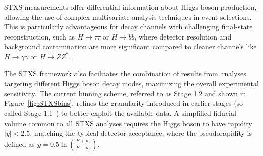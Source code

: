 STXS measurements offer differential information about Higgs boson production, allowing the use of complex multivariate analysis techniques in event selections. This is particularly advantageous for decay channels with challenging final-state reconstruction, such as $H \to \tau\tau$ or $H \to b\bar{b}$, where detector resolution and background contamination are more significant compared to cleaner channels like $H \to \gamma\gamma$ or $H \to ZZ^*$.

The STXS framework also facilitates the combination of results from analyses targeting different Higgs boson decay modes, maximizing the overall experimental sensitivity. The current binning scheme, referred to as Stage 1.2 and shown in Figure~\ref{fig:STXSbins}, refines the granularity introduced in earlier stages (so called Stage 1.1~\cite{STXS11}) to better exploit the available data. A simplified fiducial volume common to all STXS analyses requires the Higgs boson to have rapidity $|y| < 2.5$, matching the typical detector acceptance, where the pseudorapidity is defined as $y = 0.5 \ln{\left( \frac{E+p_Z}{E-p_Z} \right)}$.

